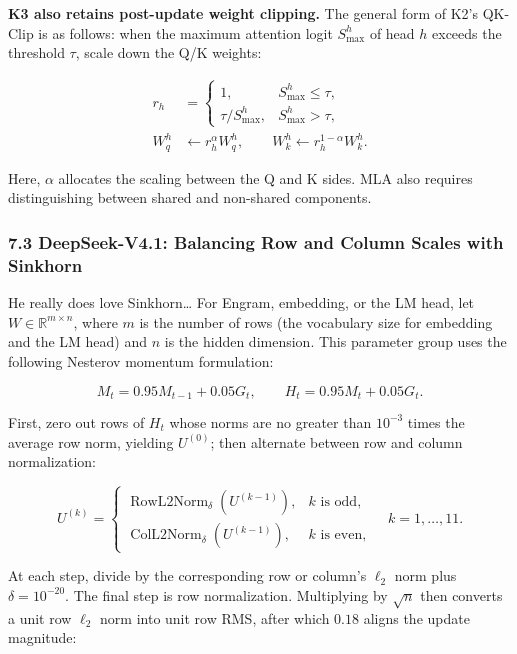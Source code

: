\documentclass[
  english,
  10pt,
  a4paper,
]{article}
\begin{document}
\textbf{K3 also retains post-update weight clipping.} The general form
of K2's QK-Clip is as follows: when the maximum attention logit
\(S_{\max}^h\) of head \(h\) exceeds the threshold \(\tau\), scale down
the Q/K weights:

\nopagebreak[4]

\[
\begin{aligned}
r_h&=\begin{cases}1,&S_{\max}^h\leq\tau,\\
\tau/S_{\max}^h,&S_{\max}^h>\tau,\end{cases}\\
W_q^h&\leftarrow r_h^\alpha W_q^h,\qquad
W_k^h\leftarrow r_h^{1-\alpha}W_k^h.
\end{aligned}
\tag{27}
\]

Here, \(\alpha\) allocates the scaling between the Q and K sides. MLA
also requires distinguishing between shared and non-shared components.

\subsubsection{7.3 DeepSeek-V4.1: Balancing Row and Column Scales with
Sinkhorn}\label{deepseek-v4.1-balancing-row-and-column-scales-with-sinkhorn}

He really does love Sinkhorn\ldots{} For Engram, embedding, or the LM
head, let \(W\in\mathbb R^{m\times n}\), where \(m\) is the number of
rows (the vocabulary size for embedding and the LM head) and \(n\) is
the hidden dimension. This parameter group uses the following Nesterov
momentum formulation:

\nopagebreak[4]

\[
M_t=0.95M_{t-1}+0.05G_t,\qquad
H_t=0.95M_t+0.05G_t.
\tag{28}
\]

First, zero out rows of \(H_t\) whose norms are no greater than
\(10^{-3}\) times the average row norm, yielding \(U^{(0)}\); then
alternate between row and column normalization:

\nopagebreak[4]

\[
U^{(k)}=\begin{cases}
\operatorname{RowL2Norm}_{\delta}(U^{(k-1)}),&k\text{ is odd},\\
\operatorname{ColL2Norm}_{\delta}(U^{(k-1)}),&k\text{ is even},
\end{cases}
\quad k=1,\ldots,11.
\tag{29}
\]

At each step, divide by the corresponding row or column's \(\ell_2\)
norm plus \(\delta=10^{-20}\). The final step is row normalization.
Multiplying by \(\sqrt n\) then converts a unit row \(\ell_2\) norm into
unit row RMS, after which \(0.18\) aligns the update magnitude:
\end{document}
